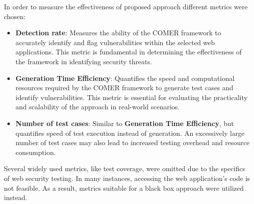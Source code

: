 In order to measure the effectiveness of proposed approach different metrics were chosen:

\begin{itemize}
	\item \textbf{Detection rate}: Measures the ability of the COMER framework to accurately identify and flag vulnerabilities within the selected web applications. This metric is fundamental in determining the effectiveness of the framework in identifying security threats.
	\item \textbf{Generation Time Efficiency}: Quantifies the speed and computational resources required by the COMER framework to generate test cases and identify vulnerabilities. This metric is essential for evaluating the practicality and scalability of the approach in real-world scenarios.
	\item \textbf{Number of test cases}: Similar to \textbf{Generation Time Efficiency}, but quantifies speed of test execution instead of generation. An excessively large number of test cases may also lead to increased testing overhead and resource consumption.
\end{itemize}

Several widely used metrics, like test coverage, were omitted due to the specifics of web security testing. In many instances, accessing the web application's code is not feasible. As a result, metrics suitable for a black box approach were utilized instead.

